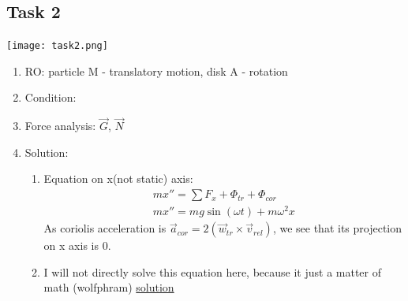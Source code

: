 \subsection*{Task 2}

\texttt{[image: task2.png]}

\begin{enumerate}
    \item RO: particle M - translatory motion, disk A - rotation
    \item Condition:
          \begin{center}
          \end{center}
    \item Force analysis: $\vec{G}$, $\vec{N}$
    \item Solution:
          \begin{enumerate}
              \item Equation on x(not static) axis:
                    \begin{align}
                        mx'' = \sum F_x + \Phi_{tr} + \Phi_{cor} \\
                        mx'' = mg \sin(\omega t) + m \omega^2 x
                    \end{align}
                    As coriolis acceleration is $\vec{a}_{cor} = 2 (\vec{w}_{tr} \times \vec{v}_{rel})$,
                    we see that its projection on x axis is $0$.
              \item I will not directly solve this equation here,
                    because it just a matter of math (wolfphram)
                    \href{https://www.wolframalpha.com/input?i=y%28t%29%27%27+%3D+g+sin%28wt%29+%2B+w%5E2+y%28t%29%2C+y%280%29%3D0%2C+y%27%280%29%3D0.4}{solution}


\end{enumerate}
\end{enumerate}
